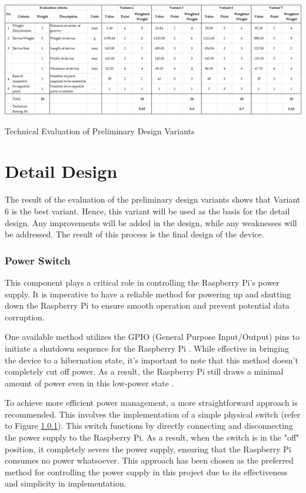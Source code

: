 \begin{table}[H]
    \centering
    \includegraphics[angle=90,origin=c, width=0.5\linewidth]{texs/Part1/chapter4/image/tech_eval.png}
    \caption{Technical Evaluation of Preliminary Design Variants}
    \label{tab:tech_eval}
\end{table}

\section{Detail Design}
\label{sec:detail_design}
The result of the evaluation of the preliminary design variants shows that Variant 6 is the best variant. Hence, this variant will be used as the basis for the detail design. Any improvements will be added in the design, while any weaknesses will be addressed. The result of this process is the final design of the device.

\subsubsection{Power Switch}

This component plays a critical role in controlling the Raspberry Pi's power supply. It is imperative to have a reliable method for powering up and shutting down the Raspberry Pi to ensure smooth operation and prevent potential data corruption.

One available method utilizes the GPIO (General Purpose Input/Output) pins to initiate a shutdown sequence for the Raspberry Pi \cite{Labidi21}. While effective in bringing the device to a hibernation state, it's important to note that this method doesn't completely cut off power. As a result, the Raspberry Pi still draws a minimal amount of power even in this low-power state \cite{jdb}.

To achieve more efficient power management, a more straightforward approach is recommended. This involves the implementation of a simple physical switch (refer to Figure \ref{}). This switch functions by directly connecting and disconnecting the power supply to the Raspberry Pi. As a result, when the switch is in the "off" position, it completely severs the power supply, ensuring that the Raspberry Pi consumes no power whatsoever. This approach has been chosen as the preferred method for controlling the power supply in this project due to its effectiveness and simplicity in implementation.

